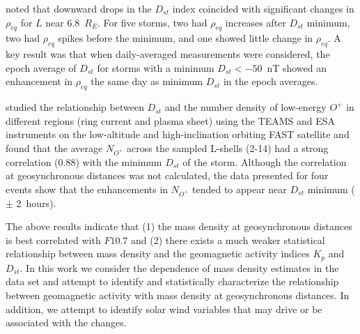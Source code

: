 \documentclass[draft,linenumbers]{agujournal}
\begin{document}
\citet{Takahashi2010} noted that downward drops in the $D_{st}$ index coincided with significant changes in $\rho_{eq}$ for $L$ near 6.8~$R_E$. For five storms, two had $\rho_{eq}$ increases after $D_{st}$ minimum, two had $\rho_{eq}$ spikes before the minimum, and one showed little change in $\rho_{eq}$.  A key result was that when daily-averaged measurements were considered, the epoch average of $D_{st}$ for storms with a minimum $D_{st} < -50$~nT showed an enhancement in $\rho_{eq}$ the same day as minimum $D_{st}$ in the epoch averages.

\citet{Yao2008} studied the relationship between $D_{st}$ and the number density of low-energy $O^+$ in different regions (ring current and plasma sheet) using the TEAMS and ESA instruments on the low-altitude and high-inclination orbiting FAST satellite and found that the average $N_{O^+}$ across the sampled L-shells (2-14) had a strong correlation (0.88) with the minimum $D_{st}$ of the storm.  Although the correlation at geosynchronous distances was not calculated, the data presented for four events show that the enhancements in $N_{O^+}$ tended to appear near $D_{st}$ minimum ($\pm$ 2~hours).

The above results indicate that (1) the mass density at geosynchronous distances is best correlated with $F10.7$ and (2) there exists a much weaker statistical relationship between mass density and the geomagnetic activity indices $K_p$ and $D_{st}$.  In this work we consider the dependence of mass density estimates in the \citet{Takahashi2010} data set and attempt to identify and statistically characterize the relationship between geomagnetic activity with mass density at geosynchronous distances.  In addition, we attempt to identify solar wind variables that may drive or be associated with the changes. 

\end{document}
